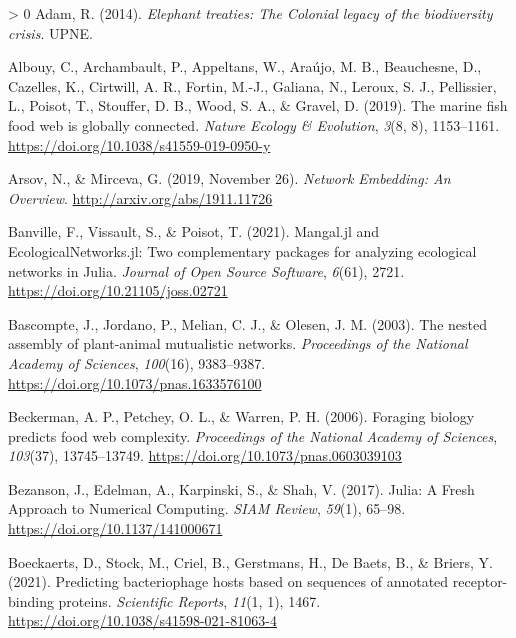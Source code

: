 \documentclass[10pt,oneside]{article}
\newlength{\cslhangindent}
\newenvironment{CSLReferences}[3] %
 {%
  \setlength{\parindent}{0pt}
  \ifodd #1 \everypar{\setlength{\hangindent}{\cslhangindent}}\ignorespaces\fi
  \ifnum #2 > 0
  \setlength{\parskip}{#2\baselineskip}
  \fi
 }%
 {}
\begin{document}
\hypertarget{refs}{}
\begin{CSLReferences}{1}{0}
\leavevmode\hypertarget{ref-Adam2014EleTre}{}%
Adam, R. (2014). \emph{Elephant treaties: The Colonial legacy of the
biodiversity crisis}. UPNE.

\leavevmode\hypertarget{ref-Albouy2019MarFis}{}%
Albouy, C., Archambault, P., Appeltans, W., Araújo, M. B., Beauchesne,
D., Cazelles, K., Cirtwill, A. R., Fortin, M.-J., Galiana, N., Leroux,
S. J., Pellissier, L., Poisot, T., Stouffer, D. B., Wood, S. A., \&
Gravel, D. (2019). The marine fish food web is globally connected.
\emph{Nature Ecology \& Evolution}, \emph{3}(8, 8), 1153--1161.
\url{https://doi.org/10.1038/s41559-019-0950-y}

\leavevmode\hypertarget{ref-Arsov2019NetEmb}{}%
Arsov, N., \& Mirceva, G. (2019, November 26). \emph{Network Embedding:
An Overview}. \url{http://arxiv.org/abs/1911.11726}

\leavevmode\hypertarget{ref-Banville2021ManJl}{}%
Banville, F., Vissault, S., \& Poisot, T. (2021). Mangal.jl and
EcologicalNetworks.jl: Two complementary packages for analyzing
ecological networks in Julia. \emph{Journal of Open Source Software},
\emph{6}(61), 2721. \url{https://doi.org/10.21105/joss.02721}

\leavevmode\hypertarget{ref-Bascompte2003NesAss}{}%
Bascompte, J., Jordano, P., Melian, C. J., \& Olesen, J. M. (2003). The
nested assembly of plant-animal mutualistic networks. \emph{Proceedings
of the National Academy of Sciences}, \emph{100}(16), 9383--9387.
\url{https://doi.org/10.1073/pnas.1633576100}

\leavevmode\hypertarget{ref-Beckerman2006ForBio}{}%
Beckerman, A. P., Petchey, O. L., \& Warren, P. H. (2006). Foraging
biology predicts food web complexity. \emph{Proceedings of the National
Academy of Sciences}, \emph{103}(37), 13745--13749.
\url{https://doi.org/10.1073/pnas.0603039103}

\leavevmode\hypertarget{ref-Bezanson2017JulFre}{}%
Bezanson, J., Edelman, A., Karpinski, S., \& Shah, V. (2017). Julia: A
Fresh Approach to Numerical Computing. \emph{SIAM Review}, \emph{59}(1),
65--98. \url{https://doi.org/10.1137/141000671}

\leavevmode\hypertarget{ref-Boeckaerts2021PreBac}{}%
Boeckaerts, D., Stock, M., Criel, B., Gerstmans, H., De Baets, B., \&
Briers, Y. (2021). Predicting bacteriophage hosts based on sequences of
annotated receptor-binding proteins. \emph{Scientific Reports},
\emph{11}(1, 1), 1467. \url{https://doi.org/10.1038/s41598-021-81063-4}


\end{CSLReferences}
\end{document}
